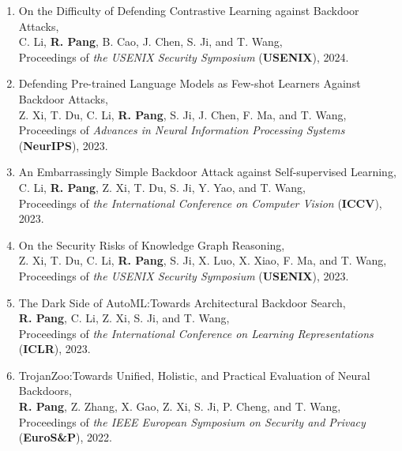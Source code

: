 \documentclass[letterpaper,11pt]{article}
\begin{document}
\begin{enumerate}[labelsep=15pt, parsep=-4pt]

    \item On the Difficulty of Defending Contrastive Learning against Backdoor Attacks,\\
    C. Li, \textbf{R. Pang}, B. Cao, J. Chen, S. Ji, and T. Wang,\\
    Proceedings of {\it the USENIX Security Symposium\/} (\textbf{USENIX}), 2024.

    \item Defending Pre-trained Language Models as Few-shot Learners Against Backdoor Attacks,\\
    Z. Xi, T. Du, C. Li, \textbf{R. Pang}, S. Ji, J. Chen, F. Ma, and T. Wang,\\
    Proceedings of {\it Advances in Neural Information Processing Systems\/} (\textbf{NeurIPS}), 2023.
    
    \item An Embarrassingly Simple Backdoor Attack against Self-supervised Learning,\\
    C. Li, \textbf{R. Pang}, Z. Xi, T. Du, S. Ji, Y. Yao, and T. Wang,\\
    Proceedings of {\it the International Conference on Computer Vision\/} (\textbf{ICCV}), 2023.
    
    \item On the Security Risks of Knowledge Graph Reasoning,\\
    Z. Xi, T. Du, C. Li, \textbf{R. Pang}, S. Ji, X. Luo, X. Xiao, F. Ma, and T. Wang,\\
    Proceedings of {\it the USENIX Security Symposium\/} (\textbf{USENIX}), 2023.
    
    \item The Dark Side of AutoML:\@ Towards Architectural Backdoor Search,\\
    \textbf{R. Pang}, C. Li, Z. Xi, S. Ji, and T. Wang,\\
    Proceedings of {\it the International Conference on Learning Representations\/} (\textbf{ICLR}), 2023.
    
    \item TrojanZoo:\@ Towards Unified, Holistic, and Practical Evaluation of Neural Backdoors,\\
    \textbf{R. Pang}, Z. Zhang, X. Gao, Z. Xi, S. Ji, P. Cheng, and T. Wang,\\
    Proceedings of {\it the IEEE European Symposium on Security and Privacy\/} (\textbf{EuroS\&P}), 2022.
    

\end{enumerate}
\end{document}
